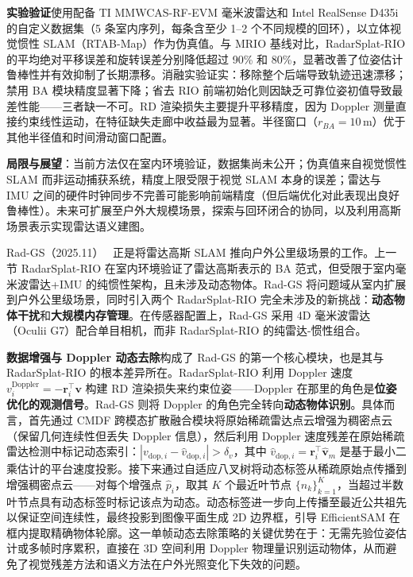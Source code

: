 \textbf{实验验证}使用配备 TI MMWCAS-RF-EVM 毫米波雷达和 Intel RealSense D435i 的自定义数据集（5 条室内序列，每条含至少 1--2 个不同规模的回环），以立体视觉惯性 SLAM（RTAB-Map）作为伪真值。与 MRIO 基线对比，RadarSplat-RIO 的平均绝对平移误差和旋转误差分别降低超过 90\% 和 80\%，显著改善了位姿估计鲁棒性并有效抑制了长期漂移。消融实验证实：移除整个后端导致轨迹迅速漂移；禁用 BA 模块精度显著下降；省去 RIO 前端初始化则因缺乏可靠位姿初值导致最差性能——三者缺一不可。RD 渲染损失主要提升平移精度，因为 Doppler 测量直接约束线性运动，在特征缺失走廊中收益最为显著。半径窗口（$r_{BA} = 10$\,m）优于其他半径值和时间滑动窗口配置。

\textbf{局限与展望}：当前方法仅在室内环境验证，数据集尚未公开；伪真值来自视觉惯性 SLAM 而非运动捕获系统，精度上限受限于视觉 SLAM 本身的误差；雷达与 IMU 之间的硬件时钟同步不完善可能影响前端精度（但后端优化对此表现出良好鲁棒性）。未来可扩展至户外大规模场景，探索与回环闭合的协同，以及利用高斯场景表示实现雷达语义建图。

Rad-GS（2025.11）~\cite{2511_16091} 正是将雷达高斯 SLAM 推向户外公里级场景的工作。上一节 RadarSplat-RIO 在室内环境验证了雷达高斯表示的 BA 范式，但受限于室内毫米波雷达+IMU 的纯惯性架构，且未涉及动态物体。Rad-GS 将问题域从室内扩展到户外公里级场景，同时引入两个 RadarSplat-RIO 完全未涉及的新挑战：\textbf{动态物体干扰}和\textbf{大规模内存管理}。在传感器配置上，Rad-GS 采用 4D 毫米波雷达（Oculii G7）配合单目相机，而非 RadarSplat-RIO 的纯雷达-惯性组合。

\textbf{数据增强与 Doppler 动态去除}构成了 Rad-GS 的第一个核心模块，也是其与 RadarSplat-RIO 的根本差异所在。RadarSplat-RIO 利用 Doppler 速度 $v_i^{\text{Doppler}} = -\mathbf{r}_i^\top \mathbf{v}$ 构建 RD 渲染损失来约束位姿——Doppler 在那里的角色是\textbf{位姿优化的观测信号}。Rad-GS 则将 Doppler 的角色完全转向\textbf{动态物体识别}。具体而言，首先通过 CMDF 跨模态扩散融合模块将原始稀疏雷达点云增强为稠密点云（保留几何连续性但丢失 Doppler 信息），然后利用 Doppler 速度残差在原始稀疏雷达检测中标记动态索引：$|v_{\text{dop},i} - \hat{v}_{\text{dop},i}| > \delta_v$，其中 $\hat{v}_{\text{dop},i} = \mathbf{r}_i^\top \hat{\mathbf{v}}_m$ 是基于最小二乘估计的平台速度投影。接下来通过自适应八叉树将动态标签从稀疏原始点传播到增强稠密点云——对每个增强点 $\hat{p}_i$，取其 $K$ 个最近叶节点 $\{n_k\}_{k=1}^K$，当超过半数叶节点具有动态标签时标记该点为动态。动态标签进一步向上传播至最近公共祖先以保证空间连续性，最终投影到图像平面生成 2D 边界框，引导 EfficientSAM 在框内提取精确物体轮廓。这一单帧动态去除策略的关键优势在于：无需先验位姿估计或多帧时序累积，直接在 3D 空间利用 Doppler 物理量识别运动物体，从而避免了视觉残差方法和语义方法在户外光照变化下失效的问题。

